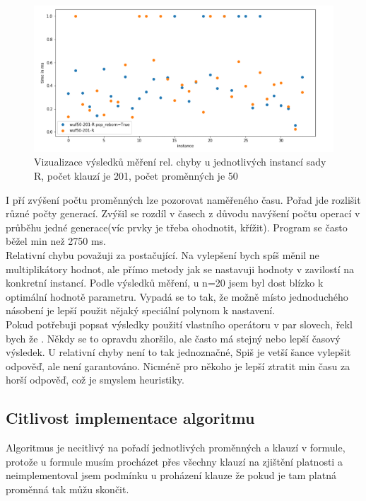 \documentclass{article}
\begin{document}
\begin{figure}[H]
    \centering
    \includegraphics[width=1.1\textwidth]{screenshot_1297}
    \caption{Vizualizace výsledků měření rel. chyby u jednotlivých instancí sady R, počet klauzí je 201, počet proměnných je 50}
    \label{fig:se_ch201}
\end{figure}
\newpage
I pří zvýšení počtu proměnných lze pozorovat  naměřeného času. Pořad jde rozlišit různé počty generací. Zvýšil se rozdíl v časech z důvodu navýšení počtu operací v průběhu jedné generace(víc prvky je třeba ohodnotit, křížit). Program se často běžel min než 2750 ms.\\

Relativní chybu považuji za postačující. Na vylepšení bych spíš měnil ne multiplikátory hodnot, ale přímo metody jak se nastavuji hodnoty v zavilostí na konkretní instancí. Podle výsledků měření, u n=20 jsem byl dost blízko k optimální hodnotě parametru. Vypadá se to tak, že možně místo jednoduchého násobení je lepší použit nějaký speciální polynom k nastavení.\\

Pokud potřebuji popsat výsledky použití vlastního operátoru v par slovech, řekl bych že . Někdy se to opravdu zhoršilo, ale často má stejný nebo lepší časový výsledek. U relativní chyby není to tak jednoznačné, Spiš je vetší šance vylepšit odpověď, ale není garantováno. Nicméně pro někoho je lepší ztratit min času za horší odpověď, což je smyslem heuristiky.

\subsection{Citlivost implementace algoritmu}

Algoritmus je necitlivý na pořadí jednotlivých proměnných a klauzí v formule, protože u formule musím procházet přes všechny klauzí na zjištění platnosti a neimplementoval jsem podmínku u proházení klauze že pokud je tam platná proměnná tak můžu skončit.\\
\end{document}
